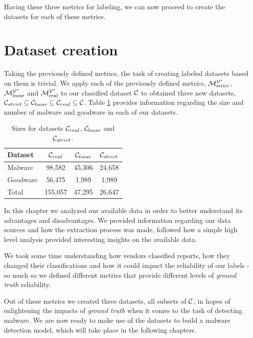 Having these three metrics for labeling, we can now proceed to create the datasets for each of these metrics.

\section{Dataset creation}
\label{section:dataset_creation}

Taking the previously defined metrics, the task of creating labeled datasets based on them is trivial.
We apply each of the previously defined metrics, $\mathcal{M}_{\mathrm{strict}}^{\mathcal{V}^*}$, $\mathcal{M}_{\mathrm{loose}}^{\mathcal{V}^*}$ and $\mathcal{M}_{\mathrm{real}}^{\mathcal{V}^*}$ to our classified dataset $\mathcal{C}$ to obtained three new datasets, $\mathcal{C}_{strict}\subseteq\mathcal{C}_{loose}\subseteq\mathcal{C}_{real}\subseteq\mathcal{C}$.
Table \ref{tab:dataset_sizes} provides information regarding the size and number of malware and goodware in each of our datasets.

\begin{table}[!htb]
	\renewcommand{\arraystretch}{1.2} %
	\centering
	\begin{tabular}{lccc}
		\toprule
		Dataset			& $\mathcal{C}_{real}$ & $\mathcal{C}_{loose}$ & $\mathcal{C}_{strict}$	\\
		\midrule
		Malware			& 98,582 & 45,306 & 24,658\\
		Goodware		& 56,475 & 1,989 & 1,989\\
		\midrule
		Total			& 155,057 & 47,295 & 26,647\\
		\bottomrule
	\end{tabular}
	\caption{Sizes for datasets $\mathcal{C}_{real}$, $\mathcal{C}_{loose}$ and $\mathcal{C}_{strict}$.}
	\label{tab:dataset_sizes}
\end{table}

\medskip

In this chapter we analyzed our available data in order to better understand its advantages and disadvantages.
We provided information regarding our data sources and how the extraction process was made, followed how a simple high level analysis provided interesting insights on the available data.

We took some time understanding how vendors classified reports, how they changed their classifications and how it could impact the reliability of our labels - so much so we defined different metrics that provide different levels of \textit{ground truth} reliability.

Out of these metrics we created three datasets, all subsets of $\mathcal{C}$, in hopes of enlightening the impacts of \textit{ground truth} when it comes to the task of detecting malware. We are now ready to make use of the datasets to build a malware detection model, which will take place in the following chapters.
